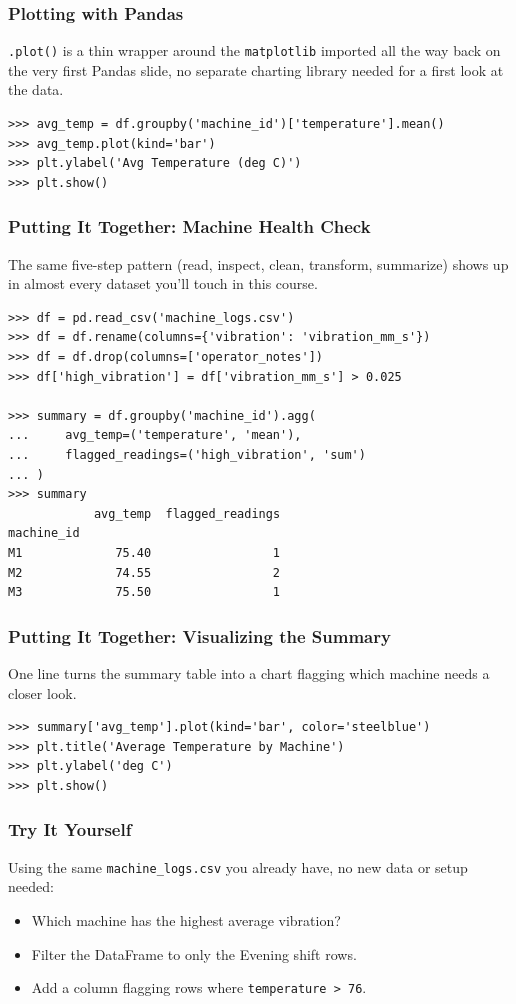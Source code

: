 \begin{frame}[fragile]\frametitle{Plotting with Pandas}
\texttt{.plot()} is a thin wrapper around the \texttt{matplotlib} imported all the way back on the very first Pandas slide, no separate charting library needed for a first look at the data.
\begin{lstlisting}
>>> avg_temp = df.groupby('machine_id')['temperature'].mean()
>>> avg_temp.plot(kind='bar')
>>> plt.ylabel('Avg Temperature (deg C)')
>>> plt.show()
\end{lstlisting}
\end{frame}

\begin{frame}[fragile]\frametitle{Putting It Together: Machine Health Check}
The same five-step pattern (read, inspect, clean, transform, summarize) shows up in almost every dataset you'll touch in this course.
\begin{lstlisting}
>>> df = pd.read_csv('machine_logs.csv')
>>> df = df.rename(columns={'vibration': 'vibration_mm_s'})
>>> df = df.drop(columns=['operator_notes'])
>>> df['high_vibration'] = df['vibration_mm_s'] > 0.025

>>> summary = df.groupby('machine_id').agg(
...     avg_temp=('temperature', 'mean'),
...     flagged_readings=('high_vibration', 'sum')
... )
>>> summary
            avg_temp  flagged_readings
machine_id
M1             75.40                 1
M2             74.55                 2
M3             75.50                 1
\end{lstlisting}
\end{frame}

\begin{frame}[fragile]\frametitle{Putting It Together: Visualizing the Summary}
One line turns the summary table into a chart flagging which machine needs a closer look.
\begin{lstlisting}
>>> summary['avg_temp'].plot(kind='bar', color='steelblue')
>>> plt.title('Average Temperature by Machine')
>>> plt.ylabel('deg C')
>>> plt.show()
\end{lstlisting}
\end{frame}

\begin{frame}[fragile]\frametitle{Try It Yourself}
Using the same \texttt{machine\_logs.csv} you already have, no new data or setup needed:
\begin{itemize}
\item Which machine has the highest average vibration?
\item Filter the DataFrame to only the Evening shift rows.
\item Add a column flagging rows where \texttt{temperature > 76}.
\end{itemize}
\end{frame}
